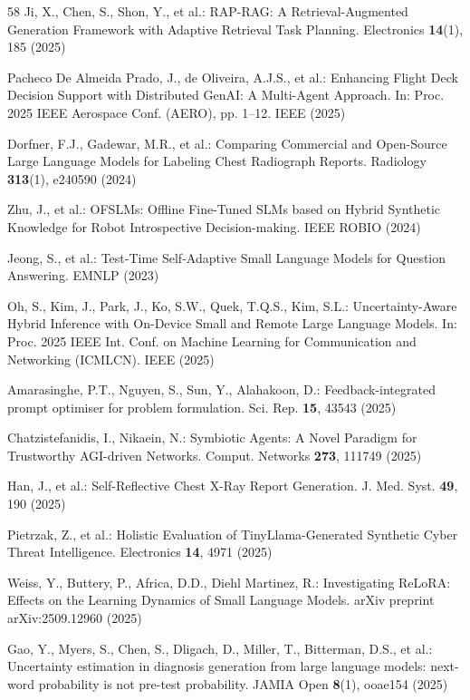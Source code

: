 \begin{thebibliography}{58}
Ji, X., Chen, S., Shon, Y., et al.: RAP-RAG: A Retrieval-Augmented Generation Framework with Adaptive Retrieval Task Planning. Electronics \textbf{14}(1), 185 (2025)

Pacheco De Almeida Prado, J., de Oliveira, A.J.S., et al.: Enhancing Flight Deck Decision Support with Distributed GenAI: A Multi-Agent Approach. In: Proc. 2025 IEEE Aerospace Conf. (AERO), pp. 1--12. IEEE (2025)

Dorfner, F.J., Gadewar, M.R., et al.: Comparing Commercial and Open-Source Large Language Models for Labeling Chest Radiograph Reports. Radiology \textbf{313}(1), e240590 (2024)

Zhu, J., et al.: OFSLMs: Offline Fine-Tuned SLMs based on Hybrid Synthetic Knowledge for Robot Introspective Decision-making. IEEE ROBIO (2024)

Jeong, S., et al.: Test-Time Self-Adaptive Small Language Models for Question Answering. EMNLP (2023)

Oh, S., Kim, J., Park, J., Ko, S.W., Quek, T.Q.S., Kim, S.L.: Uncertainty-Aware Hybrid Inference with On-Device Small and Remote Large Language Models. In: Proc. 2025 IEEE Int. Conf. on Machine Learning for Communication and Networking (ICMLCN). IEEE (2025)

Amarasinghe, P.T., Nguyen, S., Sun, Y., Alahakoon, D.: Feedback-integrated prompt optimiser for problem formulation. Sci. Rep. \textbf{15}, 43543 (2025)

Chatzistefanidis, I., Nikaein, N.: Symbiotic Agents: A Novel Paradigm for Trustworthy AGI-driven Networks. Comput. Networks \textbf{273}, 111749 (2025)

Han, J., et al.: Self-Reflective Chest X-Ray Report Generation. J. Med. Syst. \textbf{49}, 190 (2025)

Pietrzak, Z., et al.: Holistic Evaluation of TinyLlama-Generated Synthetic Cyber Threat Intelligence. Electronics \textbf{14}, 4971 (2025)

Weiss, Y., Buttery, P., Africa, D.D., Diehl Martinez, R.: Investigating ReLoRA: Effects on the Learning Dynamics of Small Language Models. arXiv preprint arXiv:2509.12960 (2025)

Gao, Y., Myers, S., Chen, S., Dligach, D., Miller, T., Bitterman, D.S., et al.: Uncertainty estimation in diagnosis generation from large language models: next-word probability is not pre-test probability. JAMIA Open \textbf{8}(1), ooae154 (2025)


\end{thebibliography}
